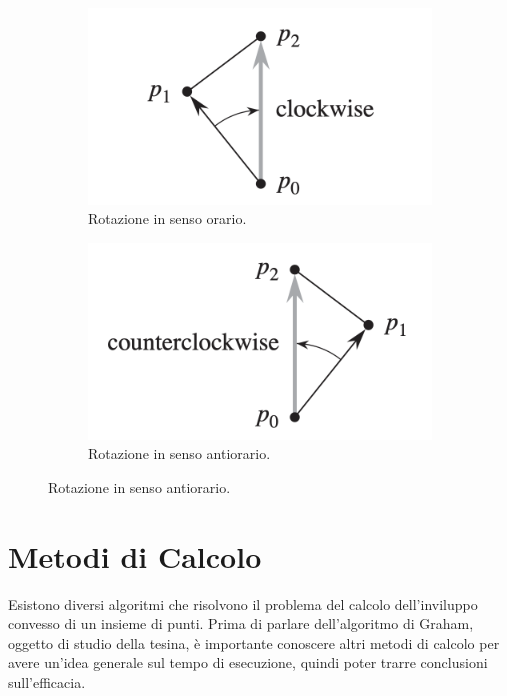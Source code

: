 \documentclass[12pt,a4paper]{report}
\begin{document}
\begin{figure}[ht]
\centering
 \begin{subfigure}{.4\textwidth}
    \centering
    \includegraphics[width=1\linewidth]{clockwise.png}
    \caption{Rotazione in senso orario.}
    \label{fig:clockwise}
 \end{subfigure}
 \begin{subfigure}{.4\textwidth}
    \centering
    \includegraphics[width=1\linewidth]{anticlockwise.png}
    \caption{Rotazione in senso antiorario.}
    \label{fig:anticlockwise}
 \end{subfigure}
\end{figure}

\section{Metodi di Calcolo}
Esistono diversi algoritmi che risolvono il problema del calcolo dell'inviluppo convesso di un insieme di punti. Prima di parlare dell'algoritmo di Graham, oggetto di studio della tesina, è importante conoscere altri metodi di calcolo per avere un'idea generale sul tempo di esecuzione, quindi poter trarre conclusioni sull'efficacia.\\
\end{document}
